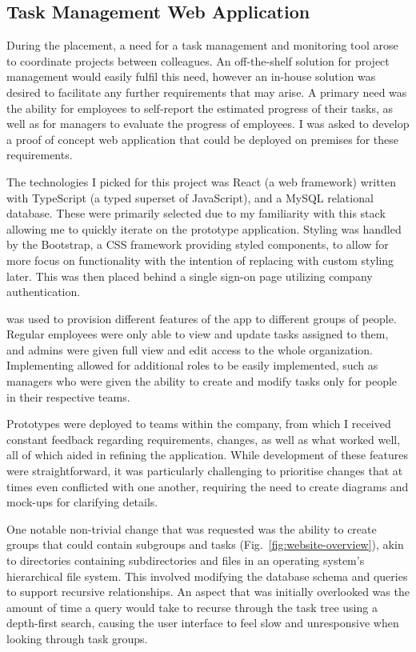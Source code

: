 \subsection{Task Management Web Application}
\label{sec:task-app}

During the placement, a need for a task management and monitoring tool arose to coordinate projects
between colleagues. An off-the-shelf  solution for project management would easily fulfil
this need, however an in-house solution was desired to facilitate any further requirements that may
arise. A primary need was the ability for employees to self-report the estimated progress of their
tasks, as well as for managers to evaluate the progress of employees. I was asked to develop a proof
of concept web application that could be deployed on premises for these requirements.

The technologies I picked for this project was React (a web framework) written with TypeScript (a
typed superset of JavaScript), and a MySQL relational database. These were primarily selected due to
my familiarity with this stack allowing me to quickly iterate on the prototype application. Styling
was handled by the Bootstrap, a CSS framework providing styled components, to allow for more focus
on functionality with the intention of replacing with custom styling later. This was then placed
behind a single sign-on page utilizing company authentication.

 was used to provision different features of the app to different groups of people.
Regular employees were only able to view and update tasks assigned to them, and admins were given
full view and edit access to the whole organization. Implementing  allowed for additional
roles to be easily implemented, such as managers who were given the ability to create and modify
tasks only for people in their respective teams.

Prototypes were deployed to teams within the company, from which I received constant feedback
regarding requirements, changes, as well as what worked well, all of which aided in refining the
application. While development of these features were straightforward, it was particularly
challenging to prioritise changes that at times even conflicted with one another, requiring the need
to create diagrams and mock-ups for clarifying details.

One notable non-trivial change that was requested was the ability to create groups that could
contain subgroups and tasks (Fig.~\ref{fig:website-overview}), akin to directories containing
subdirectories and files in an operating system's hierarchical file system. This involved modifying
the database schema and queries to support recursive relationships. An aspect that was initially
overlooked was the amount of time a query would take to recurse through the task tree using a
depth-first search, causing the user interface to feel slow and unresponsive when looking through
task groups.

